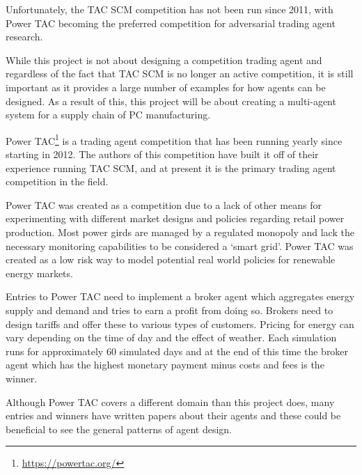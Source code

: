 Unfortunately, the TAC SCM competition has not been run since 2011, with Power TAC becoming the preferred competition for adversarial trading agent research.

While this project is not about designing a competition trading agent and regardless of the fact that TAC SCM is no longer an active competition, it is still important as it provides a large number of examples for how agents can be designed.
As a result of this, this project will be about creating a multi-agent system for a supply chain of PC manufacturing.

Power TAC\footnote{\url{https://powertac.org/}} is a trading agent competition that has been running yearly since starting in 2012.
The authors of this competition have built it off of their experience running TAC SCM, and at present it is the primary trading agent competition in the field.~\cite{ketter2013power}

Power TAC was created as a competition due to a lack of other means for experimenting with different market designs and policies regarding retail power production.
Most power girds are managed by a regulated monopoly and lack the necessary monitoring capabilities to be considered a `smart grid'.
Power TAC was created as a low risk way to model potential real world policies for renewable energy markets.~\cite{ketter2013power}

Entries to Power TAC need to implement a broker agent which aggregates energy supply and demand and tries to earn a profit from doing so.
Brokers need to design tariffs and offer these to various types of customers.
Pricing for energy can vary depending on the time of day and the effect of weather.
Each simulation runs for approximately 60 simulated days and at the end of this time the broker agent which has the highest monetary payment minus costs and fees is the winner.~\cite{ketter2020power}

Although Power TAC covers a different domain than this project does, many entries and winners have written papers about their agents and these could be beneficial to see the general patterns of agent design.
